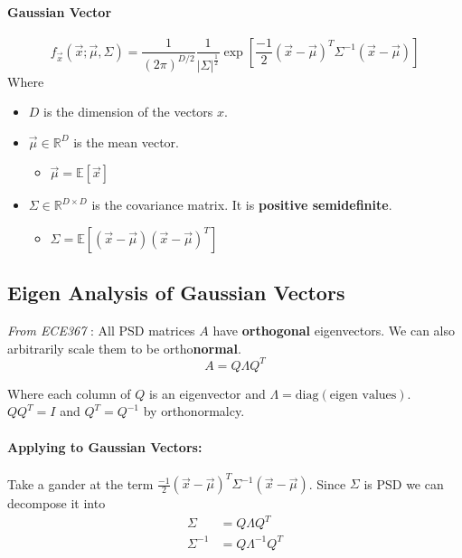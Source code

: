 \documentclass[a4paper,12pt]{report}
\begin{document}
\paragraph{Gaussian Vector} 
\begin{equation}
f_{\vec x}(\vec x; \vec \mu, \Sigma) = \frac{1}{(2\pi)^{D/2}} \frac{1}{|\Sigma|^{\frac{1}{2}}} \exp [\frac{-1}{2} (\vec x - \vec \mu)^T \Sigma^{-1} (\vec x - \vec \mu)]
\end{equation}
Where 
\begin{itemize}
\item $D$ is the dimension of the vectors $x$.
\item $\vec \mu\in \mathbb R^D$ is the mean vector.
\begin{itemize}
\item $\vec \mu = \mathbb E[\vec x]$
\end{itemize}

\item $\Sigma \in \mathbb R^{D\times D}$ is the covariance matrix. It is \textbf{positive semidefinite}.
\begin{itemize}
\item $\Sigma = \mathbb E [(\vec x - \vec \mu)(\vec x - \vec \mu)^T]$
\end{itemize}


\end{itemize}

\subsection{Eigen Analysis of Gaussian Vectors}

\textit{From ECE367} : All PSD matrices $A$ have \textbf{orthogonal} eigenvectors. We can also arbitrarily scale them to be ortho\textbf{normal}. 
\begin{equation}
A = Q\Lambda Q^T
\end{equation}

Where each column of $Q$ is an eigenvector and $\Lambda = \text{diag}(\text{eigen values})$. $QQ^T = I$ and $Q^T = Q^{-1}$ by orthonormalcy. 

\paragraph{Applying to Gaussian Vectors: } 
Take a gander at the term $\frac{-1}{2} (\vec x - \vec \mu)^T \Sigma^{-1} (\vec x - \vec \mu)$. Since $\Sigma$ is PSD we can decompose it into 
\begin{equation}
\begin{split}
\Sigma &= Q \Lambda Q^T \\
\Sigma^{-1} &= Q \Lambda^{-1} Q^T \\
\end{split}
\end{equation}
\end{document}
